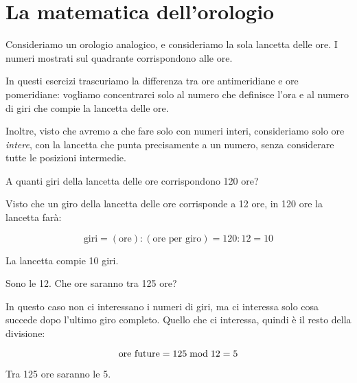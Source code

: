 \chapter{La matematica dell'orologio}
\label{ch:matematica_orologio}

Consideriamo un orologio analogico, e consideriamo la sola lancetta delle ore.
I numeri mostrati sul quadrante corrispondono alle ore.

In questi esercizi trascuriamo la differenza tra ore antimeridiane e ore pomeridiane: vogliamo concentrarci solo al
numero che definisce l'ora e al numero di giri che compie la lancetta delle ore.

Inoltre, visto che avremo a che fare solo con numeri interi, consideriamo solo ore \emph{intere}, con la lancetta che
punta precisamente a un numero, senza considerare tutte le posizioni intermedie.

\begin{esercizio}
    A quanti giri della lancetta delle ore corrispondono 120 ore?

    Visto che un giro della lancetta delle ore corrisponde a 12 ore, in 120 ore la lancetta farà:

    \begin{equation*}
        \text{giri} = (\text{ore}) : (\text{ore per giro}) = 120 : 12 = 10
    \end{equation*}

    La lancetta compie 10 giri.
\end{esercizio}

\newpage
\begin{esercizio}
    Sono le 12.
    Che ore saranno tra 125 ore?

    In questo caso non ci interessano i numeri di giri, ma ci interessa solo cosa succede dopo l'ultimo giro completo.
    Quello che ci interessa, quindi è il resto della divisione:

    \begin{equation*}
        \text{ore future} = 125  \bmod  12 = 5
    \end{equation*}

    Tra 125 ore saranno le 5.
\end{esercizio}

